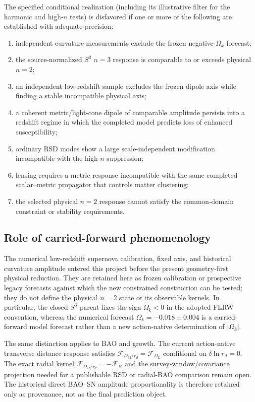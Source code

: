 The specified conditional realization (including its illustrative filter for the harmonic and high-$n$ tests) is disfavored if one or more of the following are established with adequate precision:
\begin{enumerate}
\item independent curvature measurements exclude the frozen negative-\(\Omega_k\) forecast;
\item the source-normalized \(S^3\) \(n=3\) response is comparable to or exceeds physical \(n=2\);
\item an independent low-redshift sample excludes the frozen dipole axis while finding a stable incompatible physical axis;
\item a coherent metric/light-cone dipole of comparable amplitude persists into a redshift regime in which the completed model predicts loss of enhanced susceptibility;
\item ordinary RSD modes show a large scale-independent modification incompatible with the high-\(n\) suppression;
\item lensing requires a metric response incompatible with the same completed scalar--metric propagator that controls matter clustering;
\item the selected physical \(n=2\) response cannot satisfy the common-domain constraint or stability requirements.
\end{enumerate}



\subsection{Role of carried-forward phenomenology}
The numerical low-redshift supernova calibration, fixed axis, and historical
curvature amplitude entered this project before the present geometry-first
physical reduction.  They are retained here as frozen calibration or
prospective legacy forecasts against which the new constrained construction
can be tested; they do not define the physical $n=2$ state or its observable
kernels.  In particular, the closed $S^3$ parent fixes the sign
$\Omega_k<0$ in the adopted FLRW convention, whereas the numerical forecast
$\Omega_k=-0.018\pm0.004$ is a carried-forward model forecast rather than a
new action-native determination of $|\Omega_k|$.

The same distinction applies to BAO and growth.  The current action-native
transverse distance response satisfies
$\mathcal F_{D_M/r_d}=\mathcal F_{D_L}$ conditional on
$\delta\ln r_d=0$.  The exact radial kernel
$\mathcal F_{D_H/r_d}=-\mathcal F_H$ and the survey-window/covariance
projection needed for a publishable RSD or radial-BAO comparison remain open.
The historical direct BAO--SN amplitude proportionality is therefore retained
only as provenance, not as the final prediction object.

